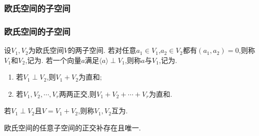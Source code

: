 \subsubsection{欧氏空间的子空间}
\begin{frame}\frametitle{欧氏空间的子空间}
\pp
\begin{definition}[正交]
设$V_1,V_2$为欧氏空间$V$的两子空间.
\pp
若对任意$a_1\in V_1$,$a_2\in V_2$都有$(a_1,a_2)=0$,则称$V_1$和$V_2$,记为.
\pp
若一个向量$a$满足$\langle a\rangle\perp V_1$,则称$a$与$V_1$,记为.
\end{definition}
\pp
\begin{theorem}
\begin{enumerate}
\item 若$V_1\perp V_2$,则$V_1+V_2$为直和;
\pp
\item 若$V_1,V_2,\cdots,V_r$两两正交,则$V_1+V_2+\cdots+V_r$为直和.
\end{enumerate}
\end{theorem}
\pp

\begin{definition}[正交补]
若$V_1\perp V_2$且$V=V_1+V_2$,则称$V_1,V_2$互为.
\end{definition}
\pp

\begin{theorem}
欧氏空间的任意子空间的正交补存在且唯一.
\end{theorem}
\end{frame}



